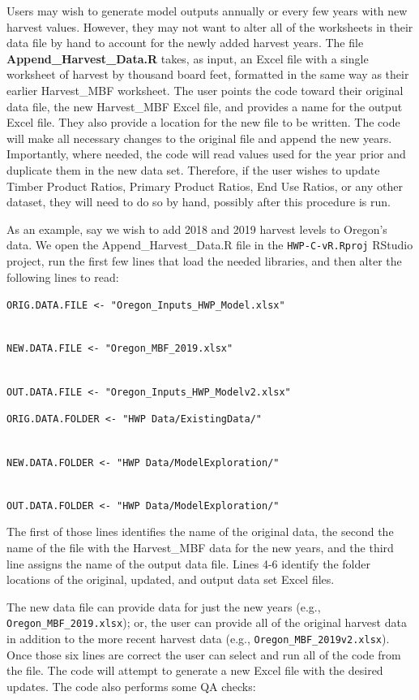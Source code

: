 \documentclass[
  openany]{book}
\begin{document}
Users may wish to generate model outputs annually or every few years
with new harvest values. However, they may not want to alter all of the
worksheets in their data file by hand to account for the newly added
harvest years. The file \textbf{Append\_Harvest\_Data.R} takes, as
input, an Excel file with a single worksheet of harvest by thousand
board feet, formatted in the same way as their earlier Harvest\_MBF
worksheet. The user points the code toward their original data file, the
new Harvest\_MBF Excel file, and provides a name for the output Excel
file. They also provide a location for the new file to be written. The
code will make all necessary changes to the original file and append the
new years. Importantly, where needed, the code will read values used for
the year prior and duplicate them in the new data set. Therefore, if the
user wishes to update Timber Product Ratios, Primary Product Ratios, End
Use Ratios, or any other dataset, they will need to do so by hand,
possibly after this procedure is run.

As an example, say we wish to add 2018 and 2019 harvest levels to
Oregon's data. We open the Append\_Harvest\_Data.R file in the
\texttt{HWP-C-vR.Rproj} RStudio project, run the first few lines that
load the needed libraries, and then alter the following lines to read:

\texttt{ORIG.DATA.FILE\ \textless{}-\ "Oregon\_Inputs\_HWP\_Model.xlsx"}\strut \\
\texttt{NEW.DATA.FILE\ \textless{}-\ "Oregon\_MBF\_2019.xlsx"}\strut \\
\texttt{OUT.DATA.FILE\ \textless{}-\ "Oregon\_Inputs\_HWP\_Modelv2.xlsx"}

\texttt{ORIG.DATA.FOLDER\ \textless{}-\ "HWP\ Data/ExistingData/"}\strut \\
\texttt{NEW.DATA.FOLDER\ \textless{}-\ "HWP\ Data/ModelExploration/"}\strut \\
\texttt{OUT.DATA.FOLDER\ \textless{}-\ "HWP\ Data/ModelExploration/"}

The first of those lines identifies the name of the original data, the
second the name of the file with the Harvest\_MBF data for the new
years, and the third line assigns the name of the output data file.
Lines 4-6 identify the folder locations of the original, updated, and
output data set Excel files.

The new data file can provide data for just the new years (e.g.,
\texttt{Oregon\_MBF\_2019.xlsx}); or, the user can provide all of the
original harvest data in addition to the more recent harvest data (e.g.,
\texttt{Oregon\_MBF\_2019v2.xlsx}). Once those six lines are correct the
user can select and run all of the code from the file. The code will
attempt to generate a new Excel file with the desired updates. The code
also performs some QA checks:
\end{document}
